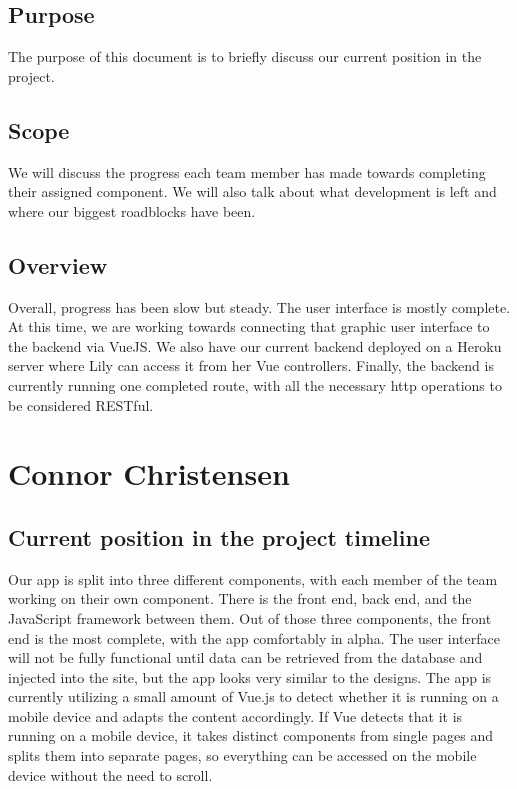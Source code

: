 \documentclass[draftclsnofoot,onecolumn,letterpaper,10pt,compsoc]{IEEEtran}
\begin{document}
\subsection{Purpose}
The purpose of this document is to briefly discuss our current position in the project.

\subsection{Scope}
We will discuss the progress each team member has made towards completing their assigned component.
We will also talk about what development is left and where our biggest roadblocks have been.

\subsection{Overview}
Overall, progress has been slow but steady.
The user interface is mostly complete.
At this time, we are working towards connecting that graphic user interface to the backend via VueJS.
We also have our current backend deployed on a Heroku server where Lily can access it from her Vue controllers.
Finally, the backend is currently running one completed route, with all the necessary http operations to be considered RESTful.

\section{Connor Christensen}
\subsection{Current position in the project timeline}

Our app is split into three different components, with each member of the team working on their own component. There is the front end, back end, and the JavaScript framework between them.
Out of those three components, the front end is the most complete, with the app comfortably in alpha.
The user interface will not be fully functional until data can be retrieved from the database and injected into the site, but the app looks very similar to the designs.
The app is currently utilizing a small amount of Vue.js to detect whether it is running on a mobile device and adapts the content accordingly.
If Vue detects that it is running on a mobile device, it takes distinct components from single pages and splits them into separate pages, so everything can be accessed on the mobile device without the need to scroll.
\end{document}
